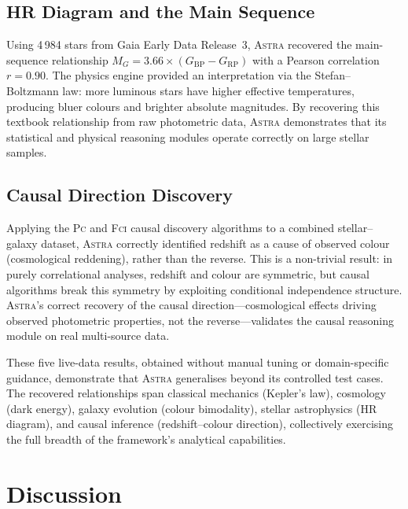 \documentclass[fleqn,usenatbib]{mnras}
\newcommand{\astra}{\textsc{Astra}\xspace}
\newcommand{\fci}{\textsc{Fci}\xspace}
\newcommand{\pc}{\textsc{Pc}\xspace}
\begin{document}
\subsection{HR Diagram and the Main Sequence}
\label{sec:live:hr}

Using 4\,984 stars from Gaia Early Data Release~3, \astra recovered the main-sequence relationship $M_{G} = 3.66 \times (G_{\mathrm{BP}} - G_{\mathrm{RP}})$ with a Pearson correlation $r = 0.90$.
The physics engine provided an interpretation via the Stefan--Boltzmann law: more luminous stars have higher effective temperatures, producing bluer colours and brighter absolute magnitudes.
By recovering this textbook relationship from raw photometric data, \astra demonstrates that its statistical and physical reasoning modules operate correctly on large stellar samples.

\subsection{Causal Direction Discovery}
\label{sec:live:causal}

Applying the \pc and \fci causal discovery algorithms to a combined stellar--galaxy dataset, \astra correctly identified redshift as a cause of observed colour (cosmological reddening), rather than the reverse.
This is a non-trivial result: in purely correlational analyses, redshift and colour are symmetric, but causal algorithms break this symmetry by exploiting conditional independence structure.
\astra's correct recovery of the causal direction---cosmological effects driving observed photometric properties, not the reverse---validates the causal reasoning module on real multi-source data.

\medskip

These five live-data results, obtained without manual tuning or domain-specific guidance, demonstrate that \astra generalises beyond its controlled test cases.
The recovered relationships span classical mechanics (Kepler's law), cosmology (dark energy), galaxy evolution (colour bimodality), stellar astrophysics (HR diagram), and causal inference (redshift--colour direction), collectively exercising the full breadth of the framework's analytical capabilities.

\section{Discussion}
\label{sec:discussion}
\end{document}
